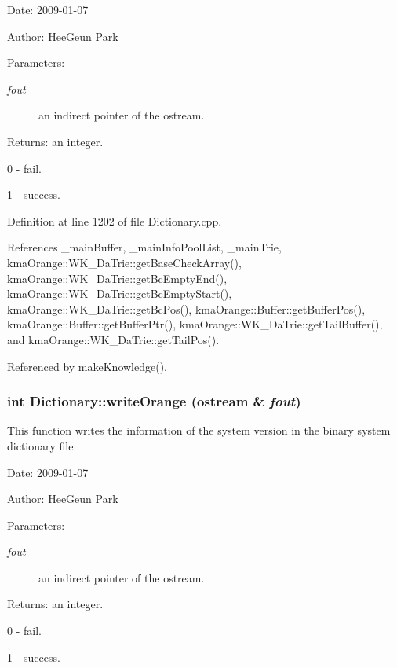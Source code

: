 \begin{Desc}
\item[Date:]2009-01-07 \end{Desc}
\begin{Desc}
\item[Author:]HeeGeun Park \end{Desc}
\begin{Desc}
\item[Parameters:]
\begin{description}
\item[{\em fout}]an indirect pointer of the ostream. \end{description}
\end{Desc}
\begin{Desc}
\item[Returns:]an integer.\par
 0 - fail.\par
 1 - success. \end{Desc}


Definition at line 1202 of file Dictionary.cpp.

References \_\-mainBuffer, \_\-mainInfoPoolList, \_\-mainTrie, kmaOrange::WK\_\-DaTrie::getBaseCheckArray(), kmaOrange::WK\_\-DaTrie::getBcEmptyEnd(), kmaOrange::WK\_\-DaTrie::getBcEmptyStart(), kmaOrange::WK\_\-DaTrie::getBcPos(), kmaOrange::Buffer::getBufferPos(), kmaOrange::Buffer::getBufferPtr(), kmaOrange::WK\_\-DaTrie::getTailBuffer(), and kmaOrange::WK\_\-DaTrie::getTailPos().

Referenced by makeKnowledge().\hypertarget{classkmaOrange_1_1Dictionary_a3b6002c7fb1df61d07f3e10842b269f}{
\subsubsection[{writeOrange}]{\setlength{\rightskip}{0pt plus 5cm}int Dictionary::writeOrange (ostream \& {\em fout})}}
\label{classkmaOrange_1_1Dictionary_a3b6002c7fb1df61d07f3e10842b269f}


This function writes the information of the system version in the binary system dictionary file. 

\begin{Desc}
\item[Date:]2009-01-07 \end{Desc}
\begin{Desc}
\item[Author:]HeeGeun Park \end{Desc}
\begin{Desc}
\item[Parameters:]
\begin{description}
\item[{\em fout}]an indirect pointer of the ostream. \end{description}
\end{Desc}
\begin{Desc}
\item[Returns:]an integer.\par
 0 - fail.\par
 1 - success. \end{Desc}


